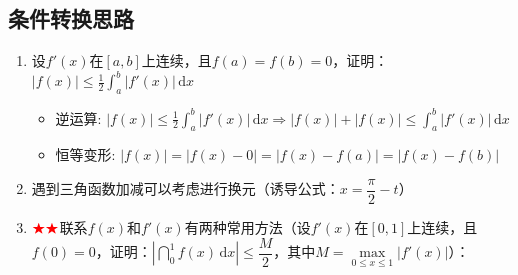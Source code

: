 \documentclass[../book.tex]{subfiles}
\begin{document}
    \subsection{条件转换思路}

    \begin{enumerate}
        \item 设$f'(x)$在$[a, b]$上连续，且$f(a) = f(b) = 0$，证明：$|f(x)| \leq \displaystyle\frac{1}{2}\int_a^b |f'(x)|\,\mathrm{d}x$
        \begin{itemize}
            \item 逆运算: $|f(x)| \leq \displaystyle\frac{1}{2}\int_a^b |f'(x)|\,\mathrm{d}x \Rightarrow |f(x)| + |f(x)| \leq \displaystyle\int_a^b |f'(x)|\,\mathrm{d}x$
            \item 恒等变形: $|f(x)| = |f(x) - 0| = |f(x) - f(a)| = |f(x) - f(b)|$
        \end{itemize}
        \item 遇到三角函数加减可以考虑进行换元（诱导公式：$x = \dfrac{\pi}{2} - t$）
        \item $\color{red}{\bigstar\bigstar}$联系$f(x)$和$f'(x)$有两种常用方法（设$f'(x)$在$[0, 1]$上连续，且$f(0) = 0$，证明：$\left|\dint_0^1 f(x)\,\mathrm{d}x \right| \leq \dfrac{M}{2}$，其中$M = \max\limits_{0 \leq x \leq 1}|f'(x)|$）：
\end{enumerate}
\end{document}
